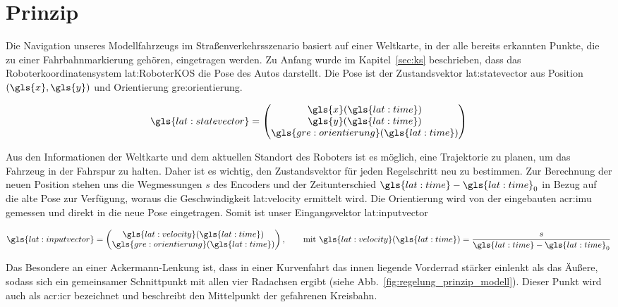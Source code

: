 \section{Prinzip}

Die Navigation unseres Modellfahrzeugs im Straßenverkehrsszenario basiert auf einer Weltkarte, in der alle bereits erkannten Punkte, die zu einer Fahrbahnmarkierung gehören, eingetragen werden. Zu Anfang wurde im Kapitel~\ref{sec:ks} beschrieben, dass das Roboterkoordinatensystem \gls{lat:RoboterKOS} die Pose des Autos darstellt. Die Pose ist der Zustandsvektor \gls{lat:statevector} aus Position \( (\gls{x},\gls{y}) \) und Orientierung \gls{gre:orientierung}.

\begin{equation}
\gls{lat:statevector} = 
\begin{pmatrix}
\gls{x}(\gls{lat:time}) 	\\
\gls{y}(\gls{lat:time})	\\
\gls{gre:orientierung}(\gls{lat:time})    	\\
\end{pmatrix}
\end{equation} 

 Aus den Informationen der Weltkarte und dem aktuellen Standort des Roboters ist es möglich, eine Trajektorie zu planen, um das Fahrzeug in der Fahrspur zu halten. Daher ist es wichtig, den Zustandsvektor für jeden Regelschritt neu zu bestimmen. Zur Berechnung der neuen Position stehen uns die Wegmessungen \(s\) des Encoders und der Zeitunterschied \(\gls{lat:time}-{\gls{lat:time}}_0\) in Bezug auf die alte Pose zur Verfügung, woraus die Geschwindigkeit \gls{lat:velocity} ermittelt wird. Die Orientierung wird von der eingebauten \gls{acr:imu} gemessen und direkt in die neue Pose eingetragen. Somit ist unser Eingangsvektor \gls{lat:inputvector}
 
\begin{equation}
\gls{lat:inputvector} = 
\begin{pmatrix}
\gls{lat:velocity}(\gls{lat:time}) 			\\
\gls{gre:orientierung}(\gls{lat:time})    	\\
\end{pmatrix}
, \qquad \text{mit }
\gls{lat:velocity}(\gls{lat:time}) = \frac{s}{\gls{lat:time}-{\gls{lat:time}}_0}
\end{equation} 
 
Das Besondere an einer Ackermann-Lenkung ist, dass in einer Kurvenfahrt das innen liegende Vorderrad stärker einlenkt als das Äußere, sodass sich ein gemeinsamer Schnittpunkt mit allen vier Radachsen ergibt (siehe Abb.~\ref{fig:regelung_prinzip_modell}). Dieser Punkt wird auch als \gls{acr:icr} bezeichnet und beschreibt den Mittelpunkt der gefahrenen Kreisbahn. 

